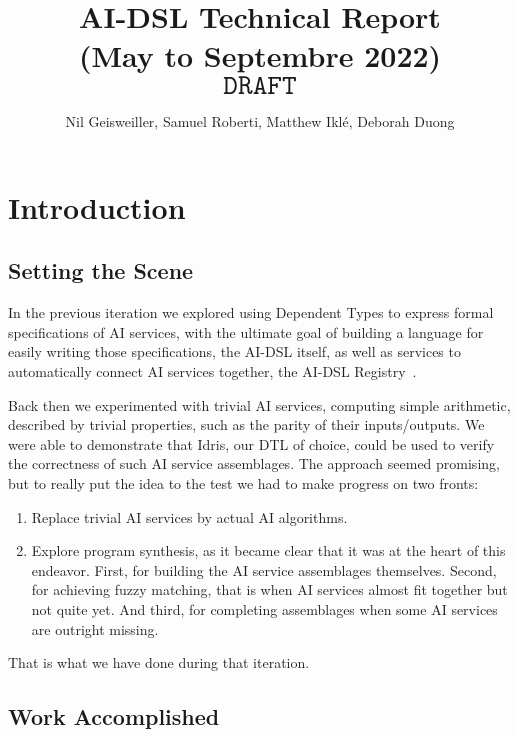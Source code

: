 \documentclass[]{report}
\begin{document}
\title{AI-DSL Technical Report\\(May to Septembre 2022) \[\texttt{DRAFT}\]}
\author{Nil Geisweiller, Samuel Roberti, Matthew Ikl\'e, Deborah Duong}
\maketitle

\begin{abstract}
\end{abstract}

\tableofcontents

\chapter{Introduction}

\section{Setting the Scene}

In the previous iteration we explored using Dependent Types to express
formal specifications of AI services, with the ultimate goal of
building a language for easily writing those specifications, the
AI-DSL itself, as well as services to automatically connect AI
services together, the AI-DSL Registry~\cite{AIDSLReport2021}.

Back then we experimented with trivial AI services, computing simple
arithmetic, described by trivial properties, such as the parity of
their inputs/outputs.  We were able to demonstrate that Idris, our DTL
of choice, could be used to verify the correctness of such AI service
assemblages.  The approach seemed promising, but to really put the
idea to the test we had to make progress on two fronts:

\begin{enumerate}
\item Replace trivial AI services by actual AI algorithms.
\item Explore program synthesis, as it became clear that it was at the
  heart of this endeavor.  First, for building the AI service
  assemblages themselves.  Second, for achieving fuzzy matching, that
  is when AI services almost fit together but not quite yet.  And
  third, for completing assemblages when some AI services are outright
  missing.
\end{enumerate}
That is what we have done during that iteration.

\section{Work Accomplished}
\end{document}
